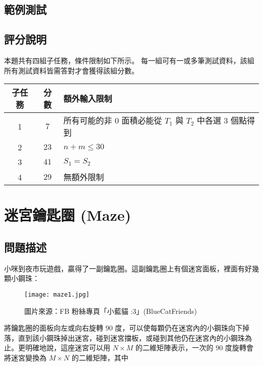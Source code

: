 \subsection{範例測試}

\begin{example}
%
%
%
\end{example}

\subsection{評分說明}

本題共有四組子任務，條件限制如下所示。
每一組可有一或多筆測試資料，該組所有測試資料皆需答對才會獲得該組分數。

\begin{longtable}[]{@{}ccl@{}}
\toprule
子任務 & 分數 & 額外輸入限制 \\
\midrule
\endhead
1 & \(7\) & 所有可能的非 \(0\) 面積必能從 \(T_1\) 與 \(T_2\) 中各選
\(3\) 個點得到 \\
2 & \(23\) & \(n+m \le 30\) \\
3 & \(41\) & \(S_1 = S_2\) \\
4 & \(29\) & 無額外限制 \\
\bottomrule
\end{longtable}

\section{迷宮鑰匙圈 (Maze)}

\subsection{問題描述}

小咪到夜市玩遊戲，贏得了一副鑰匙圈。這副鑰匙圈上有個迷宮面板，裡面有好幾顆小鋼珠：

\begin{figure}[!htb]
  \centering
  \texttt{[image: maze1.jpg]}
  \caption{圖片來源：FB 粉絲專頁「小藍貓 :3」(BlueCatFriends)}
\end{figure}

\noindent 將鑰匙圈的面板向左或向右旋轉 \(90\)
度，可以使每顆仍在迷宮內的小鋼珠向下掉落，直到該小鋼珠掉出迷宮，碰到迷宮擋板，或碰到其他仍在迷宮內的小鋼珠為止。更明確地說，這座迷宮可以用
\(N\times M\) 的二維矩陣表示，一次的 \(90\) 度旋轉會將迷宮變換為
\(M\times N\) 的二維矩陣，其中

